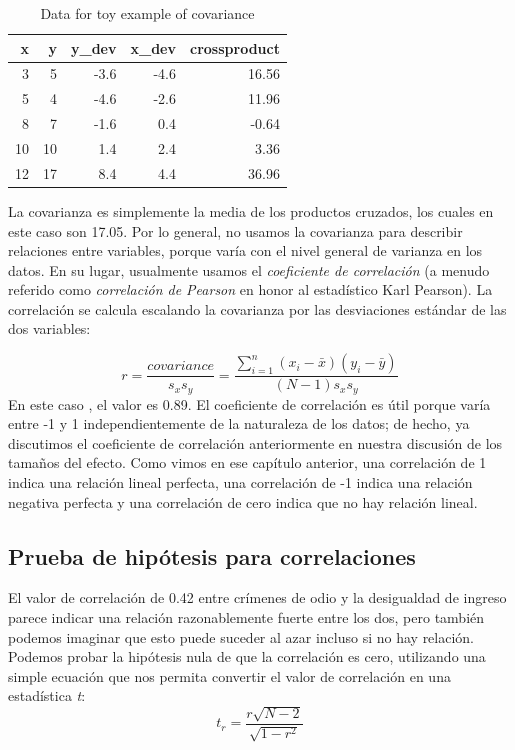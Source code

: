 \documentclass[
  12pt,
]{book}
\theoremstyle{definition}
\theoremstyle{definition}
\theoremstyle{definition}
\theoremstyle{remark}
\begin{document}
\begin{table}

\caption{\label{tab:unnamed-chunk-88}Data for toy example of covariance}
\centering
\begin{tabular}[t]{r|r|r|r|r}
\hline
x & y & y\_dev & x\_dev & crossproduct\\
\hline
3 & 5 & -3.6 & -4.6 & 16.56\\
\hline
5 & 4 & -4.6 & -2.6 & 11.96\\
\hline
8 & 7 & -1.6 & 0.4 & -0.64\\
\hline
10 & 10 & 1.4 & 2.4 & 3.36\\
\hline
12 & 17 & 8.4 & 4.4 & 36.96\\
\hline
\end{tabular}
\end{table}

La covarianza es simplemente la media de los productos cruzados, los cuales en este caso son 17.05. Por lo general, no usamos la covarianza para describir relaciones entre variables, porque varía con el nivel general de varianza en los datos. En su lugar, usualmente usamos el \emph{coeficiente de correlación} (a menudo referido como \emph{correlación de Pearson} en honor al estadístico Karl Pearson). La correlación se calcula escalando la covarianza por las desviaciones estándar de las dos variables:

\[
r = \frac{covariance}{s_xs_y} = \frac{\sum_{i=1}^n (x_i - \bar{x})(y_i - \bar{y})}{(N - 1)s_x s_y}
\]
En este caso , el valor es 0.89. El coeficiente de correlación es útil porque varía entre -1 y 1 independientemente de la naturaleza de los datos; de hecho, ya discutimos el coeficiente de correlación anteriormente en nuestra discusión de los tamaños del efecto. Como vimos en ese capítulo anterior, una correlación de 1 indica una relación lineal perfecta, una correlación de -1 indica una relación negativa perfecta y una correlación de cero indica que no hay relación lineal.

\hypertarget{prueba-de-hipuxf3tesis-para-correlaciones}{%
\subsection{Prueba de hipótesis para correlaciones}\label{prueba-de-hipuxf3tesis-para-correlaciones}}

El valor de correlación de 0.42 entre crímenes de odio y la desigualdad de ingreso parece indicar una relación razonablemente fuerte entre los dos, pero también podemos imaginar que esto puede suceder al azar incluso si no hay relación. Podemos probar la hipótesis nula de que la correlación es cero, utilizando una simple ecuación que nos permita convertir el valor de correlación en una estadística \emph{t}:
\[
\textit{t}_r =  \frac{r\sqrt{N-2}}{\sqrt{1-r^2}}
\]
\end{document}
